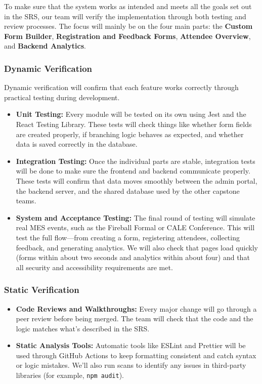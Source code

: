 \documentclass[12pt, titlepage]{article}
\begin{document}
To make sure that the system works as intended and meets all the goals set out in the SRS, our team will verify the implementation through both testing and review processes. The focus will mainly be on the four main parts: the \textbf{Custom Form Builder}, \textbf{Registration and Feedback Forms}, \textbf{Attendee Overview}, and \textbf{Backend Analytics}.

\subsubsection*{Dynamic Verification}
Dynamic verification will confirm that each feature works correctly through practical testing during development.

\begin{itemize}
  \item \textbf{Unit Testing:} Every module will be tested on its own using Jest and the React Testing Library. These tests will check things like whether form fields are created properly, if branching logic behaves as expected, and whether data is saved correctly in the database.
  \item \textbf{Integration Testing:} Once the individual parts are stable, integration tests will be done to make sure the frontend and backend communicate properly. These tests will confirm that data moves smoothly between the admin portal, the backend server, and the shared database used by the other capstone teams.
  \item \textbf{System and Acceptance Testing:} The final round of testing will simulate real MES events, such as the Fireball Formal or CALE Conference. This will test the full flow—from creating a form, registering attendees, collecting feedback, and generating analytics. We will also check that pages load quickly (forms within about two seconds and analytics within about four) and that all security and accessibility requirements are met.
\end{itemize}

\subsubsection*{Static Verification}
\begin{itemize}
  \item \textbf{Code Reviews and Walkthroughs:} Every major change will go through a peer review before being merged. The team will check that the code and the logic matches what’s described in the SRS.
  \item \textbf{Static Analysis Tools:} Automatic tools like ESLint and Prettier will be used through GitHub Actions to keep formatting consistent and catch syntax or logic mistakes. We’ll also run scans to identify any issues in third-party libraries (for example, \texttt{npm audit}).
\end{itemize}
\end{document}
